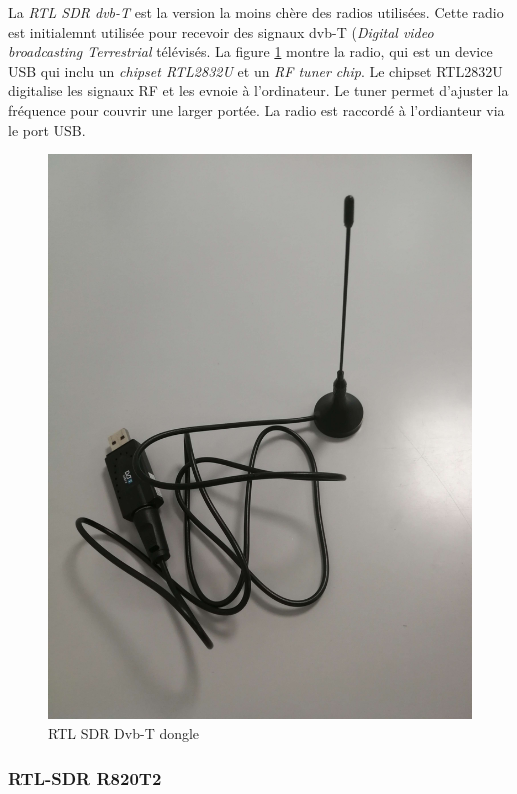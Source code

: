 La \textit{RTL SDR dvb-T} est la version la moins chère des radios utilisées. Cette radio est initialemnt utilisée pour recevoir des signaux dvb-T (\textit{Digital video broadcasting Terrestrial} télévisés. La figure \ref{term31} montre la radio, qui est un device USB qui inclu un \textit{chipset RTL2832U} et un \textit{RF tuner chip}. Le chipset RTL2832U digitalise les signaux RF et les evnoie à l'ordinateur. Le tuner permet d'ajuster la fréquence pour couvrir une larger portée.
La radio est raccordé à l'ordianteur via le port USB.

\begin{figure}[h]
\centering

\includegraphics[scale=0.08]{images/dvbt.png}
\caption{RTL SDR Dvb-T dongle}\label{term31}
\end{figure}

\newpage

\subsubsection{RTL-SDR R820T2}

